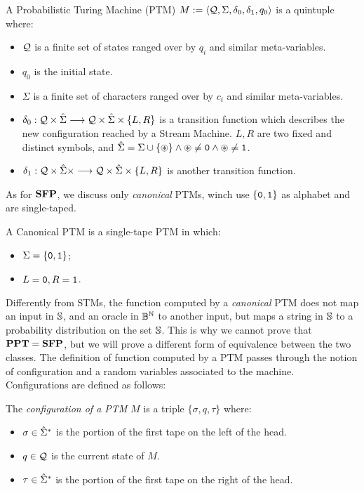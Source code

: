 \begin{defn}
  \label{def:ptm}
A Probabilistic Turing Machine (PTM)
$M:= \langle \mathcal{Q}, \Sigma, {\delta}_0, {\delta}_1, q_0 \rangle$ is a quintuple where:
\begin{itemize}
  \item $\mathcal{Q}$ is a finite set of states ranged over by $q_i$ and similar meta-variables.
  \item $q_0$ is the initial state.
\item $\Sigma$ is a finite set of characters ranged over by $c_i$ and similar meta-variables.
\item $\delta_0 : \mathcal{Q} \times \hat{\Sigma} \longrightarrow \mathcal{Q} \times \hat{\Sigma} \times \{L, R\}$
is a transition function which describes the new configuration reached by a Stream Machine.
$L, R$ are two fixed and distinct symbols, and $\hat{\Sigma} =\Sigma \cup \{\circledast\} \land \circledast\neq \mathtt{0} \land \circledast \neq \mathtt{1}$.
\item $\delta_1 : \mathcal{Q} \times \hat{\Sigma}  \times \longrightarrow \mathcal{Q} \times \hat{\Sigma} \times \{L, R\}$ is another transition function.
\end{itemize}
\end{defn}
\noindent
As for $\mathbf{SFP}$, we discuss only \emph{canonical} PTMs,
winch use $\{\mathtt{0}, \mathtt{1}\}$ as alphabet and are single-taped.
%

\begin{defn}
  A Canonical PTM is a single-tape PTM in which:
  \begin{itemize}
    \item $\Sigma =\{\mathtt{0}, \mathtt{1}\}$;
    \item $L = \mathtt{0}, R = \mathtt{1}$.
  \end{itemize}
\end{defn}

Differently from STMs, the function computed by a \emph{canonical} PTM does not map an input in $\mathbb{S}$,
and an oracle in $\mathbb{B}^{\mathbb{N}}$ to another input,
but maps a string in $\mathbb{S}$ to a probability distribution on the set $\mathbb{S}$. This is
why we cannot prove that $\mathbf{PPT}=\mathbf{SFP}$, but we will prove a different form of equivalence
between the two classes.
%
The definition of function computed by a PTM passes through the
notion of configuration and a random variables associated to the machine.
%
Configurations are defined as follows:
%
\begin{defn}
The \emph{configuration of a PTM} $M$ is a triple $\{\sigma, q, \tau\}$ where:
\begin{itemize}
\item $\sigma \in \hat{\Sigma}^*$ is the portion of the first tape on the left of the head.
\item $q \in \mathcal{Q}$ is the current state of $M$.
\item $\tau \in \hat{\Sigma}^*$ is the portion of the first tape on the right of the head.
\end{itemize}
\end{defn}

